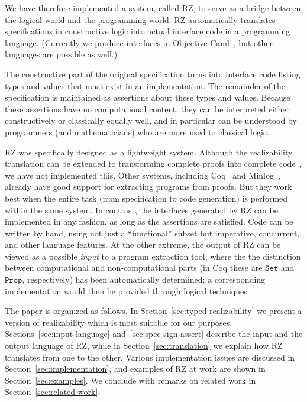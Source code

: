 
We have therefore implemented a system, called RZ, to serve as a bridge between
the logical world and the programming world. RZ automatically translates
specifications in constructive logic into actual interface code in a
programming language. (Currently we produce interfaces in 
Objective Caml~\cite{ocaml}, but other languages are possible
as well.)

The constructive part of the original specification turns into interface code
listing types and values that must exist in an implementation. The remainder of
the specification is maintained as assertions about these types and values.
Because these assertions have no computational content, they can be interpreted
either constructively or classically equally well, and in particular can
be understood by programmers (and mathematicians) who are more used to
classical logic.


RZ was specifically designed as a lightweight system. Although the
realizability translation can be extended to transforming complete
proofs into complete code~\cite{komagata+:tr95}, we have not
implemented this. Other systems, including Coq~\cite{coqart} and
Minlog~\cite{benl98:_proof_theor_work}, already have good support for
extracting programs from proofs. But they work best when the entire
task (from specification to code generation) is performed within the
same system. In contrast, the interfaces generated by RZ can be
implemented in any fashion, as long as the assertions are satisfied.
Code can be written by hand, using not just a ``functional'' subset
but imperative, concurrent, and other language features. At the other
extreme, the output of RZ can be viewed as a possible \emph{input} to
a program extraction tool, where the the distinction between
computational and non-computational parts (in Coq these are
$\mathtt{Set}$ and $\mathtt{Prop}$, respectively) has been
automatically determined; a corresponding implementation would then be
provided through logical techniques.


The paper is organized as follows. In
Section~\ref{sec:typed-realizability} we present a version of
realizability which is most suitable for our purposes.
Sections~\ref{sec:input-language} and~\ref{sec:spec-sign-assert}
describe the input and the output language of RZ, while in
Section~\ref{sec:translation} we explain how RZ translates from one to
the other. Various implementation issues are discussed in
Section~\ref{sec:implementation}, and examples of RZ at work are shown
in Section~\ref{sec:examples}. We conclude with remarks on related
work in Section~\ref{sec:related-work}.


